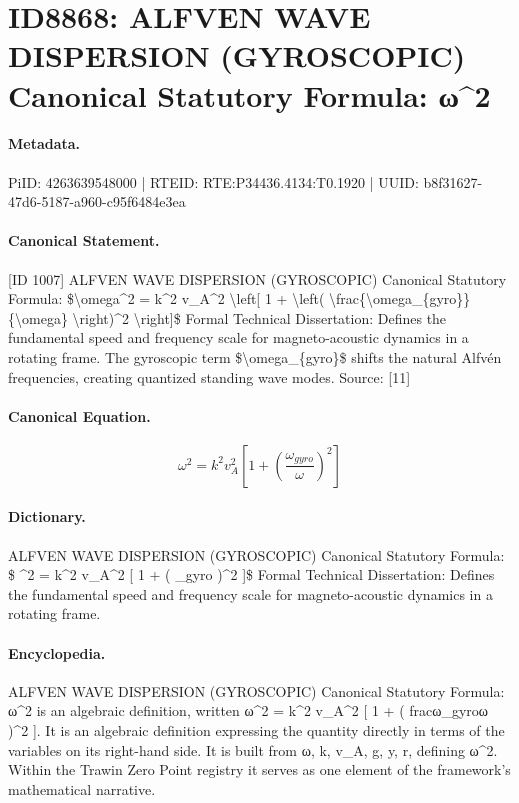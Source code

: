 \section*{ID8868: ALFVEN WAVE DISPERSION (GYROSCOPIC) Canonical Statutory Formula: ω\textasciicircum{}2}
\paragraph{Metadata.}
PiID: 4263639548000 | RTEID: RTE:P34436.4134:T0.1920 | UUID: b8f31627-47d6-5187-a960-c95f6484e3ea

\paragraph{Canonical Statement.}
[ID 1007] ALFVEN WAVE DISPERSION (GYROSCOPIC) Canonical Statutory Formula: \$\textbackslash{}omega\textasciicircum{}2 = k\textasciicircum{}2 v\_A\textasciicircum{}2 \textbackslash{}left[ 1 + \textbackslash{}left( \textbackslash{}frac\{\textbackslash{}omega\_\{gyro\}\}\{\textbackslash{}omega\} \textbackslash{}right)\textasciicircum{}2 \textbackslash{}right]\$ Formal Technical Dissertation: Defines the fundamental speed and frequency scale for magneto-acoustic dynamics in a rotating frame. The gyroscopic term \$\textbackslash{}omega\_\{gyro\}\$ shifts the natural Alfvén frequencies, creating quantized standing wave modes. Source: [11]

\paragraph{Canonical Equation.}
\[
\omega^2 = k^2 v_A^2 \left[ 1 + \left( \frac{\omega_{gyro}}{\omega} \right)^2 \right]
\]

\paragraph{Dictionary.}
ALFVEN WAVE DISPERSION (GYROSCOPIC) Canonical Statutory Formula: \$ \textasciicircum{}2 = k\textasciicircum{}2 v\_A\textasciicircum{}2 [ 1 + ( \_gyro )\textasciicircum{}2 ]\$ Formal Technical Dissertation: Defines the fundamental speed and frequency scale for magneto-acoustic dynamics in a rotating frame.

\paragraph{Encyclopedia.}
ALFVEN WAVE DISPERSION (GYROSCOPIC) Canonical Statutory Formula: ω\textasciicircum{}2 is an algebraic definition, written ω\textasciicircum{}2 = k\textasciicircum{}2 v\_A\textasciicircum{}2 [ 1 + ( fracω\_gyroω )\textasciicircum{}2 ]. It is an algebraic definition expressing the quantity directly in terms of the variables on its right-hand side. It is built from ω, k, v\_A, g, y, r, defining ω\textasciicircum{}2. Within the Trawin Zero Point registry it serves as one element of the framework's mathematical narrative.
